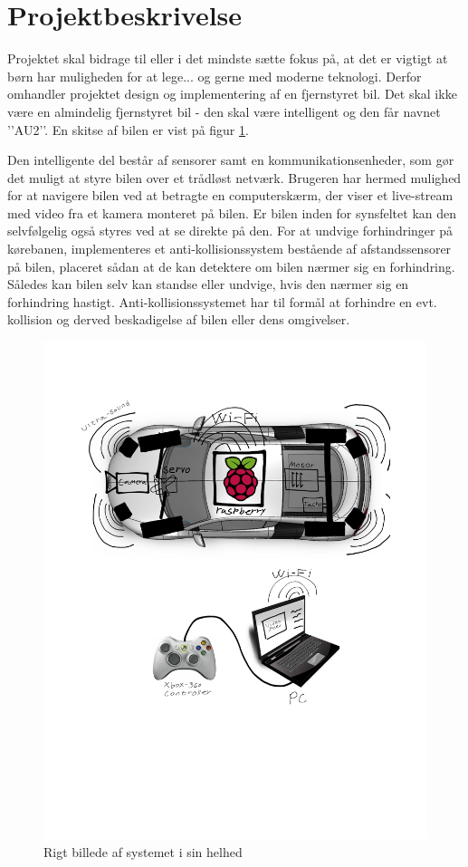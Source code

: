 \section{Projektbeskrivelse} \label{sec:beskrivelse}


Projektet skal bidrage til eller i det mindste sætte fokus på, at det er vigtigt at børn har muligheden for at lege... og gerne med moderne teknologi. Derfor omhandler projektet design og implementering af en fjernstyret bil. Det skal ikke være en almindelig fjernstyret bil - den skal være intelligent og den får navnet ’’AU2’’. En skitse af bilen er vist på figur \ref{fig:rigbillede}.

Den intelligente del består af sensorer samt en kommunikationsenheder, som gør det muligt at styre bilen over et trådløst netværk. Brugeren har hermed mulighed for at navigere bilen ved at betragte en computerskærm, der viser et live-stream med video fra et kamera monteret på bilen. Er bilen inden for synsfeltet kan den selvfølgelig også styres ved at se direkte på den. For at undvige forhindringer på kørebanen, implementeres et anti-kollisionssystem bestående af afstandssensorer på bilen, placeret sådan at de kan detektere om bilen nærmer sig en forhindring. Således kan bilen selv kan standse eller undvige, hvis den nærmer sig en forhindring hastigt. Anti-kollisionssystemet har til formål at  forhindre en evt. kollision og derved beskadigelse af bilen eller dens omgivelser.

\begin{figure}[h]
\centering
\includegraphics[width=\textwidth - 7.38 cm]{../fig/billeder/rigbillede}
\caption{Rigt billede af systemet i sin helhed}
\label{fig:rigbillede}
\end{figure}


 					 \cleartorightpage